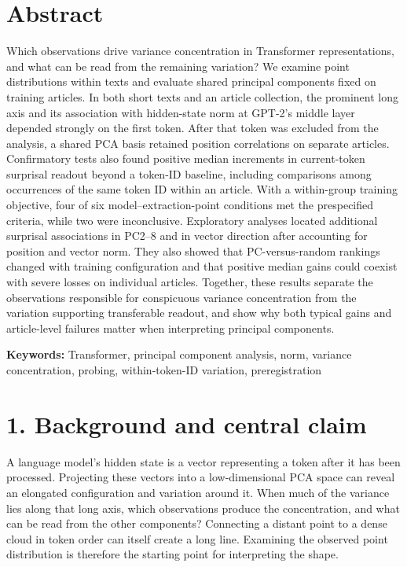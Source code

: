 \FloatBarrier

\section{Abstract}\label{abstract}

Which observations drive variance concentration in Transformer representations, and what can be read from the remaining variation? We examine point distributions within texts and evaluate shared principal components fixed on training articles. In both short texts and an article collection, the prominent long axis and its association with hidden-state norm at GPT-2's middle layer depended strongly on the first token. After that token was excluded from the analysis, a shared PCA basis retained position correlations on separate articles. Confirmatory tests also found positive median increments in current-token surprisal readout beyond a token-ID baseline, including comparisons among occurrences of the same token ID within an article. With a within-group training objective, four of six model--extraction-point conditions met the prespecified criteria, while two were inconclusive. Exploratory analyses located additional surprisal associations in PC2--8 and in vector direction after accounting for position and vector norm. They also showed that PC-versus-random rankings changed with training configuration and that positive median gains could coexist with severe losses on individual articles. Together, these results separate the observations responsible for conspicuous variance concentration from the variation supporting transferable readout, and show why both typical gains and article-level failures matter when interpreting principal components.

\textbf{Keywords:} Transformer, principal component analysis, norm, variance concentration, probing, within-token-ID variation, preregistration

\FloatBarrier

\clearpage
\section{1. Background and central claim}\label{background-and-central-claim}

A language model's hidden state is a vector representing a token after it has been processed. Projecting these vectors into a low-dimensional PCA space can reveal an elongated configuration and variation around it. When much of the variance lies along that long axis, which observations produce the concentration, and what can be read from the other components? Connecting a distant point to a dense cloud in token order can itself create a long line. Examining the observed point distribution is therefore the starting point for interpreting the shape.


